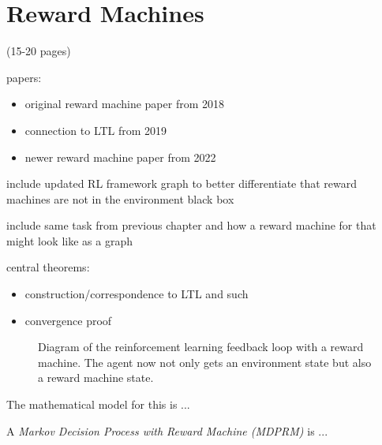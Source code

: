 \section{Reward Machines}

\begin{notes}
    (15-20 pages)

    papers:
    \begin{itemize}
        \item original reward machine paper from 2018 \cite{RM2018}
        \item connection to LTL from 2019 \cite{LTL2019}
        \item newer reward machine paper from 2022 \cite{RM2022}
    \end{itemize}

    include updated RL framework graph to better differentiate that reward machines are not in the environment black box

    include same task from previous chapter and how a reward machine for that might look like as a graph

    central theorems:
    \begin{itemize}
        \item construction/correspondence to LTL and such
        \item convergence proof
    \end{itemize}

\end{notes}


\usetikzlibrary{graphs, quotes}
\begin{figure}[h]
    \centering
    \caption{Diagram of the reinforcement learning feedback loop with a reward machine. The agent now not only gets an environment state but also a reward machine state.}
    \label{fig:rm_framework}
\end{figure}

The mathematical model for this is ...

\begin{definition}
    \label{def:mdprm}
    A \emph{Markov Decision Process with Reward Machine (MDPRM)} is ...
\end{definition}